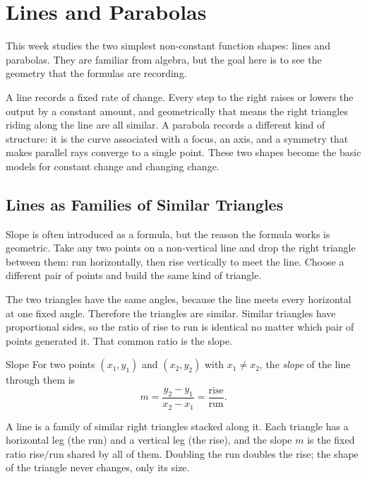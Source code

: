 \documentclass[12pt]{book}
\begin{document}
\chapter{Lines and Parabolas}

This week studies the two simplest non-constant function shapes: lines and parabolas.
They are familiar from algebra, but the goal here is to see the geometry that the
formulas are recording.

A line records a fixed rate of change. Every step to the right raises or lowers the
output by a constant amount, and geometrically that means the right triangles riding
along the line are all similar. A parabola records a different kind of structure: it
is the curve associated with a focus, an axis, and a symmetry that makes parallel rays
converge to a single point. These two shapes become the basic models for constant
change and changing change.

\section{Lines as Families of Similar Triangles}

Slope is often introduced as a formula, but the reason the formula works is
geometric. Take any two points on a non-vertical line and drop the right triangle
between them: run horizontally, then rise vertically to meet the line. Choose a
different pair of points and build the same kind of triangle.

The two triangles have the same angles, because the line meets every horizontal at
one fixed angle. Therefore the triangles are similar. Similar triangles have
proportional sides, so the ratio of rise to run is identical no matter which pair of
points generated it. That common ratio is the slope.
\begin{definition}{Slope}
For two points $(x_1,y_1)$ and $(x_2,y_2)$ with $x_1\neq x_2$, the \emph{slope} of
the line through them is
\[
m=\frac{y_2-y_1}{x_2-x_1}=\frac{\text{rise}}{\text{run}}.
\]
\end{definition}

\begin{visual}
A line is a family of similar right triangles stacked along it. Each triangle has a
horizontal leg (the run) and a vertical leg (the rise), and the slope $m$ is the
fixed ratio rise$/$run shared by all of them. Doubling the run doubles the rise; the
shape of the triangle never changes, only its size.
\end{visual}
\end{document}
